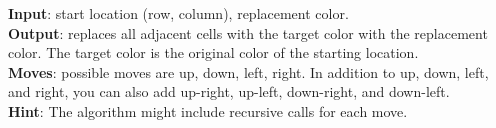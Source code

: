 \documentclass[a4paper]{exam}
\begin{document}
\begin{questions}
\textbf{Input}: start location (row, column), replacement color. \\
\textbf{Output}: replaces all adjacent cells with the target color with the replacement color. The target color is the original color of the starting location. \\
\textbf{Moves}: possible moves are up, down, left, right. In addition to up, down, left, and right, you can also add up-right, up-left, down-right, and down-left. \\
\textbf{Hint}: The algorithm might include recursive calls for each move. \\



\end{questions}
\end{document}
